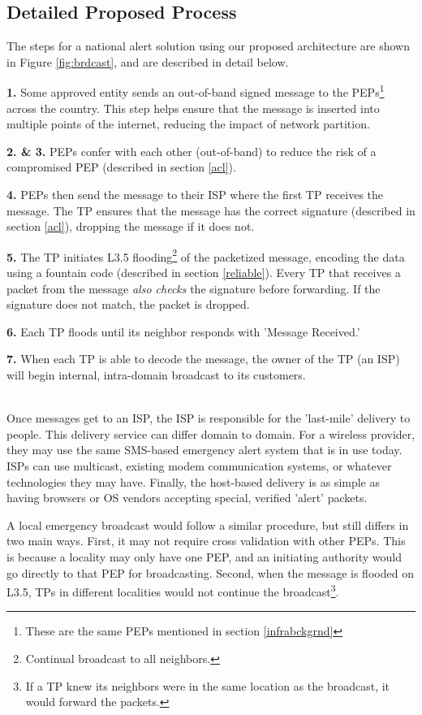 \subsection{Detailed Proposed Process}
The steps for a national alert solution using our proposed architecture are shown in Figure \ref{fig:brdcast}, and are described in detail below.

\textbf{1.} Some approved entity sends an out-of-band signed message to the PEPs\footnote{These are the same PEPs mentioned in section \ref{infrabckgrnd}} across the country. This step helps ensure that the message is inserted into multiple points of the internet, reducing the impact of network partition. 

\textbf{2. \& 3.} PEPs confer with each other (out-of-band) to reduce the risk of a compromised PEP (described in section \ref{acl}). 

\textbf{4.} PEPs then send the message to their ISP where the first TP receives the message. The TP ensures that the message has the correct signature (described in section \ref{acl}), dropping the message if it does not.

\textbf{5.} The TP initiates L3.5 flooding\footnote{Continual broadcast to all neighbors.} of the packetized message, encoding the data using a fountain code (described in section \ref{reliable}). Every TP that receives a packet from the message \textit{also checks} the signature before forwarding. If the signature does not match, the packet is dropped.

\textbf{6.} Each TP floods until its neighbor responds with 'Message Received.' 

\textbf{7.} When each TP is able to decode the message, the owner of the TP (an ISP) will begin internal, intra-domain broadcast to its customers.

\\
Once messages get to an ISP, the ISP is responsible for the 'last-mile' delivery to people. This delivery service can differ domain to domain. For a wireless provider, they may use the same SMS-based emergency alert system that is in use today. ISPs can use multicast, existing modem communication systems, or whatever technologies they may have. Finally, the host-based delivery is as simple as having browsers or OS vendors accepting special, verified 'alert' packets. 

A local emergency broadcast would follow a similar procedure, but still differs in two main ways. First, it may not require cross validation with other PEPs. This is because a locality may only have one PEP, and an initiating authority would go directly to that PEP for broadcasting. Second, when the message is flooded on L3.5, TPs in different localities would not continue the broadcast\footnote{If a TP knew its neighbors were in the same location as the broadcast, it would forward the packets.}. 

